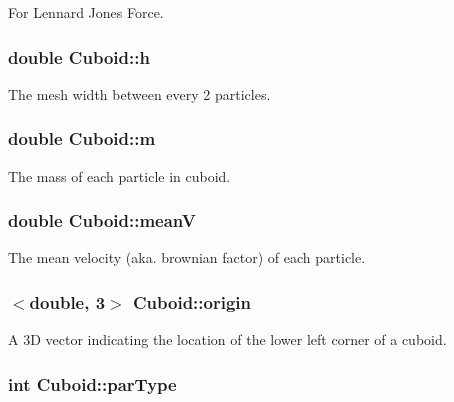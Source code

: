 For Lennard Jones Force. \hypertarget{classCuboid_ad5d539f1c69b321fbbe2dcceef65faba}{
\subsubsection[{h}]{\setlength{\rightskip}{0pt plus 5cm}double Cuboid\-::h\hspace{0.3cm}{\ttfamily [private]}}}\label{classCuboid_ad5d539f1c69b321fbbe2dcceef65faba}
The mesh width between every 2 particles. \hypertarget{classCuboid_a98975bdfb1bd4bbb327167d07d1ffdd4}{
\subsubsection[{m}]{\setlength{\rightskip}{0pt plus 5cm}double Cuboid\-::m\hspace{0.3cm}{\ttfamily [private]}}}\label{classCuboid_a98975bdfb1bd4bbb327167d07d1ffdd4}
The mass of each particle in cuboid. \hypertarget{classCuboid_ab6bb8eb2a87d77e67acea088f6a8ba88}{
\subsubsection[{mean\-V}]{\setlength{\rightskip}{0pt plus 5cm}double Cuboid\-::mean\-V\hspace{0.3cm}{\ttfamily [private]}}}\label{classCuboid_ab6bb8eb2a87d77e67acea088f6a8ba88}
The mean velocity (aka. brownian factor) of each particle. \hypertarget{classCuboid_ab9fea399762342f5636ea69038606ba1}{
\subsubsection[{origin}]{$<$double, 3$>$ Cuboid\-::origin\hspace{0.3cm}{\ttfamily [private]}}}\label{classCuboid_ab9fea399762342f5636ea69038606ba1}
A 3\-D vector indicating the location of the lower left corner of a cuboid. \hypertarget{classCuboid_acd3e5d96f6da99b24468ee9673f9daba}{
\subsubsection[{par\-Type}]{\setlength{\rightskip}{0pt plus 5cm}int Cuboid\-::par\-Type\hspace{0.3cm}{\ttfamily [private]}}}\label{classCuboid_acd3e5d96f6da99b24468ee9673f9daba}
